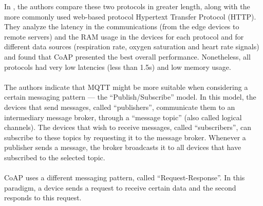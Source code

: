 In \cite{Rubi2019}, the authors compare these two protocols in greater length, along with the more commonly used web-based protocol Hypertext Transfer Protocol (HTTP). They analyze the latency in the communications (from the edge devices to remote servers) and the RAM usage in the devices for each protocol and for different data sources (respiration rate, oxygen saturation and heart rate signals) and found that \acs{CoAP} presented the best overall performance. Nonetheless, all protocols had very low latencies (less than 1.5s) and low memory usage.

\paragraph{} The authors indicate that \acs{MQTT} might be more suitable when considering a certain messaging pattern — the ``Publish/Subscribe'' model. In this model, the devices that send messages, called ``publishers'', communicate them to an intermediary message broker, through a ``message topic'' (also called logical channels). The devices that wish to receive messages, called ``subscribers'', can subscribe to these topics by requesting it to the message broker. Whenever a publisher sends a message, the broker broadcasts it to all devices that have subscribed to the selected topic.

\paragraph{} \acs{CoAP} uses a different messaging pattern, called ``Request-Response''. In this paradigm, a device sends a request to receive certain data and the second responds to this request.

